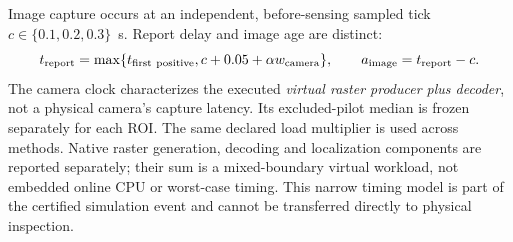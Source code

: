 Image capture occurs at an independent, before-sensing sampled tick $c\in\{0.1,0.2,0.3\}$~s. Report delay and image age are distinct:
\begin{equation}
t_{\rm report}=\max\{t_{\rm first\ positive},c+0.05+\alpha w_{\rm camera}\},\qquad
a_{\rm image}=t_{\rm report}-c.\label{eq:r9-report}
\end{equation}
The camera clock characterizes the executed \emph{virtual raster producer plus decoder}, not a physical camera's capture latency. Its excluded-pilot median is frozen separately for each ROI. The same declared load multiplier is used across methods. Native raster generation, decoding and localization components are reported separately; their sum is a mixed-boundary virtual workload, not embedded online CPU or worst-case timing. This narrow timing model is part of the certified simulation event and cannot be transferred directly to physical inspection.
